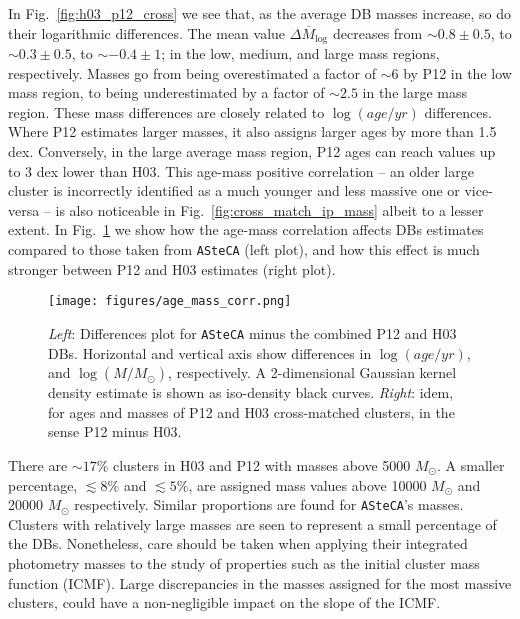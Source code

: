 \documentclass[referee]{aa}
\begin{document}
%
In Fig.~\ref{fig:h03_p12_cross} we see that, as the average DB masses
increase, so do their logarithmic differences.
The mean value $\overline{\Delta M_{\log}}$ decreases from ${\sim}0.8\pm0.5$,
to ${\sim}0.3\pm0.5$, to ${\sim-}0.4\pm1$; in the low, medium, and large mass
regions, respectively. Masses go from being overestimated a factor of ${\sim}6$
by P12 in the low mass region, to being underestimated by a factor of
${\sim}2.5$ in the large mass region.
%
These mass differences are closely related to $\log(age/yr)$ differences.
Where P12 estimates larger masses, it also assigns larger ages by more than 1.5
dex. Conversely, in the large average mass region, P12 ages can reach
values up to 3 dex lower than H03.
%
This age-mass positive correlation -- an older large cluster is incorrectly
identified as a much younger and less massive one or vice-versa -- is
also noticeable in Fig.~\ref{fig:cross_match_ip_mass} albeit to a lesser
extent. In Fig.~\ref{fig:age_mass_corr} we show how the age-mass correlation
affects DBs estimates compared to those taken from \texttt{ASteCA} (left plot),
and how this effect is much stronger between P12 and H03 estimates (right plot).

\begin{figure}
\centering
\texttt{[image: figures/age\_mass\_corr.png]}
\caption{\emph{Left}: Differences plot for \texttt{ASteCA} minus the combined
P12 and H03 DBs. Horizontal and vertical axis show differences in
$\log(age/yr)$, and $\log(M/M_{\odot})$, respectively.
A 2-dimensional Gaussian kernel density estimate is shown as iso-density black
curves.
\emph{Right}: idem, for ages and masses of P12 and H03 cross-matched clusters,
in the sense P12 minus H03.}
\label{fig:age_mass_corr}
\end{figure}

There are ${\sim}17\%$ clusters in H03 and P12 with masses above 5000
$M_{\odot}$. A smaller percentage, ${\lesssim}8\%$ and ${\lesssim}5\%$, are
assigned mass values above 10000 $M_{\odot}$ and 20000 $M_{\odot}$ respectively.
Similar proportions are found for \texttt{ASteCA}'s masses.
%
Clusters with relatively large masses are seen to represent a small percentage
of the DBs. Nonetheless, care should be taken when applying their integrated
photometry masses to the study of properties such as the initial cluster mass
function (ICMF). Large discrepancies in the masses assigned for the most massive
clusters, could have a non-negligible impact on the slope of the ICMF.\@
\end{document}

